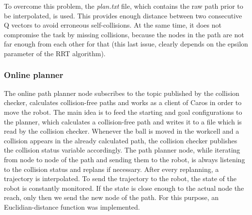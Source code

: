 To overcome this problem, the \textit{plan.txt} file, which contains the raw path prior to be interpolated, is used. This provides enough distance between two consecutive Q vectors to avoid erroneous self-collisions. At the same time, it does not compromise the task by missing collisions, because the nodes in the path are not far enough from each other for that (this last issue, clearly depends on the epsilon parameter of the RRT algorithm). 

\subsubsection{Online planner}
The online path planner node subscribes to the topic published by the collision checker, calculates collision-free paths and works as a client of Caros in order to move the robot. The main idea is to feed the starting and goal configurations to the planner, which calculates a collision-free path and writes it to a file which is read by the collision checker. Whenever the ball is moved in the workcell and a collision appears in the already calculated path, the collision checker publishes the collision status variable accordingly. The path planner node, while iterating from node to node of the path and sending them to the robot, is always listening to the collision status and replans if necessary. After every replanning, a trajectory is interpolated. To send the trajectory to the robot, the state of the robot is constantly monitored. If the state is close enough to the actual node the reach, only then we send the new node of the path. For this purpose, an Euclidian-distance function was implemented.